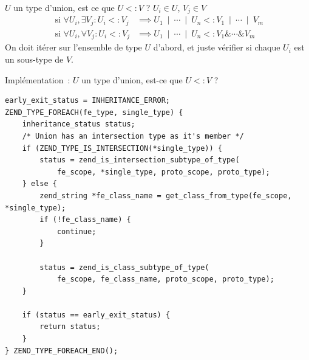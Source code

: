 \documentclass[10pt]{beamer}
\newcommand{\union}{\:\mathrel{|}\:}
\newcommand{\inter}{\mathrel{\&}}
\newcommand{\mif}{\text{ si }}
\newcommand{\subtype}{\mathrel{<:}}
\begin{document}
\begin{frame}{$U$ un type d'union, est ce que $U \subtype V$ ?}
    $U_i \in U$, $V_j \in V$
    \begin{align}
        \mif\forall U_i, \exists V_j : U_i \subtype V_j & \implies U_1\union\cdots\union U_n \subtype V_1\union\cdots\union V_m \\
        \mif\forall U_i, \forall V_j : U_i \subtype V_j & \implies U_1\union\cdots\union U_n \subtype V_1\inter\cdots\inter V_m
    \end{align}
    On doit itérer sur l'ensemble de type $U$ d'abord, et juste vérifier si chaque $U_i$ est un sous-type de $V$. 
\end{frame}
\begin{frame}[fragile]{Implémentation~: $U$ un type d'union, est-ce que $U \subtype V$ ?}
    \begin{verbatim}
early_exit_status = INHERITANCE_ERROR;
ZEND_TYPE_FOREACH(fe_type, single_type) {
    inheritance_status status;
    /* Union has an intersection type as it's member */
    if (ZEND_TYPE_IS_INTERSECTION(*single_type)) {
        status = zend_is_intersection_subtype_of_type(
            fe_scope, *single_type, proto_scope, proto_type);
    } else {
        zend_string *fe_class_name = get_class_from_type(fe_scope, *single_type);
        if (!fe_class_name) {
            continue;
        }

        status = zend_is_class_subtype_of_type(
            fe_scope, fe_class_name, proto_scope, proto_type);
    }

    if (status == early_exit_status) {
        return status;
    }
} ZEND_TYPE_FOREACH_END();
    \end{verbatim}
\end{frame}
\end{document}
